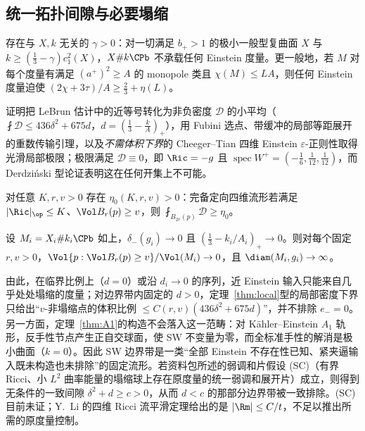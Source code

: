 \subsection{统一拓扑间隙与必要塌缩}
\begin{theorem}\label{thm:U}
存在与 $X,k$ 无关的 $\gamma>0$：对一切满足 $b_+>1$ 的极小一般型复曲面 $X$ 与 $k\ge(\frac13-\gamma)c_1^2(X)$，$X\#k\CPb$ 不承载任何 Einstein 度量。更一般地，若 $M$ 对每个度量有满足 $(a^+)^2\ge A$ 的 monopole 类且 $\chi(M)\le LA$，则任何 Einstein 度量迫使 $(2\chi+3\tau)/A\ge\frac23+\eta(L)$。
\end{theorem}
证明把 LeBrun 估计中的近等号转化为非负密度 $\mathcal D$ 的小平均（$\fint\mathcal D\le436\delta^2+675d$，$d=(\frac13-\frac kA)_+$），用 Fubini 选点、带缓冲的局部等距展开的重数传输引理，以及\emph{不需体积下界}的 Cheeger--Tian \cite{CT} 四维 Einstein $\varepsilon$-正则性取得光滑局部极限；极限满足 $\mathcal D\equiv0$，即 $\Ric=-g$ 且 $\operatorname{spec}W^+=(-\frac16,\frac1{12},\frac1{12})$，而 Derdziński \cite{Derd} 型论证表明这在任何开集上不可能。

\begin{theorem}\label{thm:local}
对任意 $K,r,v>0$ 存在 $\eta_0(K,r,v)>0$：完备定向四维流形若满足 $|\Ric|_{\op}\le K$、$\Vol B_r(p)\ge v$，则 $\fint_{B_{2r}(p)}\mathcal D\ge\eta_0$。
\end{theorem}

\begin{theorem}[必要塌缩]\label{thm:collapse}
设 $M_i=X_i\#k_i\CPb$ 如上，$\delta_-(g_i)\to0$ 且 $(\frac13-k_i/A_i)_+\to0$。则对每个固定 $r,v>0$，$\Vol\{p:\Vol B_r(p)\ge v\}/\Vol(M_i)\to0$，且 $\diam(M_i,g_i)\to\infty$。
\end{theorem}
由此，在临界比例上（$d=0$）或沿 $d_i\to0$ 的序列，近 Einstein 输入只能来自几乎处处塌缩的度量；对边界带内固定的 $d>0$，定理~\ref{thm:local}型的局部密度下界只给出“$v$-非塌缩点的体积比例 $\le C(r,v)(436\delta^2+675d)$”，并不排除 $e_-=0$。另一方面，定理~\ref{thm:A1}的构造不会落入这一范畴：对 Kähler--Einstein $A_1$ 轨形，反手性节点产生正自交球面，使 SW 不变量为零，而全标准手性的解消是极小曲面（$k=0$）。因此 SW 边界带是一类“全部 Einstein 不存在性已知、紧夹逼输入既未构造也未排除”的固定流形。若资料包所述的弱调和片假设 (SC)（有界 Ricci、小 $L^2$ 曲率能量的塌缩球上存在原度量的统一弱调和展开片）成立，则得到无条件的一致间隙 $\delta^2+d\ge c>0$，从而 $d<c$ 的那部分边界带被一致排除。(SC) 目前未证；Y.~Li \cite{Li} 的四维 Ricci 流平滑定理给出的是 $|\Rm|\le C/t$，不足以推出所需的原度量控制。

